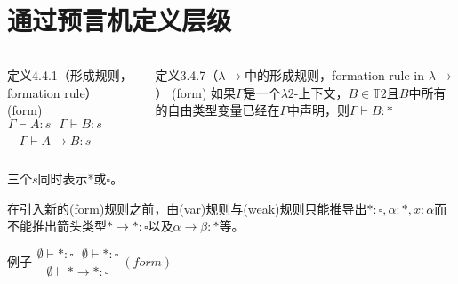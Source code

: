 \documentclass[UTF8,aspectratio=169,mathserif]{beamer}
\begin{document}
	\section{通过预言机定义层级}
	\begin{frame}
		\begin{columns}
			\begin{column}{0.48\textwidth}
				\begin{exampleblock}{定义4.4.1（形成规则，formation rule）}
					(form)\ $\dfrac{\Gamma\vdash A:s\ \ \ \Gamma\vdash B:s}{\Gamma\vdash A\rightarrow B:s}$
				\end{exampleblock}
			\end{column}
			\begin{column}{0.48\textwidth}
				\begin{block}{定义3.4.7（$\lambda{\rightarrow}$中的形成规则，formation rule in $\lambda{\rightarrow}$）}
					(form) 如果$\Gamma$是一个$\lambda{2}$-上下文，$B\in\mathbb{T}2$且$B$中所有的自由类型变量已经在$\Gamma$中声明，则$\Gamma\vdash B:*$
				\end{block}
			\end{column}
		\end{columns}
		
		三个$s$同时表示*或$\square$。
		
		在引入新的(form)规则之前，由(var)规则与(weak)规则只能推导出$*:\square,\alpha:*,x:\alpha$而不能推出箭头类型$*\rightarrow*:\square$以及$\alpha\rightarrow\beta:*$等。
		
		\begin{block}{例子}
			$\dfrac{\emptyset\vdash*:\square\ \ \ \emptyset\vdash*:\square}{\emptyset\vdash*\rightarrow*:\square}\ (form)$
		\end{block}
		
	\end{frame}
	
\end{document}
